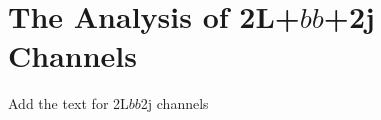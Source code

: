 \section{The Analysis of 2L+$bb$+2j Channels }
\label{sec:LLbb2j}
Add the text for 2L$bb$2j channels


